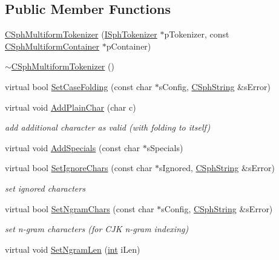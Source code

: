 \subsection*{Public Member Functions}
\begin{DoxyCompactItemize}
\item 
\hyperlink{classCSphMultiformTokenizer_aa8fb0bfe59c607b2fb6d7445d768e87b}{C\-Sph\-Multiform\-Tokenizer} (\hyperlink{classISphTokenizer}{I\-Sph\-Tokenizer} $\ast$p\-Tokenizer, const \hyperlink{structCSphMultiformContainer}{C\-Sph\-Multiform\-Container} $\ast$p\-Container)
\item 
\hyperlink{classCSphMultiformTokenizer_a6480ca37ffcd6fa83bb75df3e3e43501}{$\sim$\-C\-Sph\-Multiform\-Tokenizer} ()
\item 
virtual bool \hyperlink{classCSphMultiformTokenizer_a94d5a9911d1bfd113ec15d18e84e70e8}{Set\-Case\-Folding} (const char $\ast$s\-Config, \hyperlink{structCSphString}{C\-Sph\-String} \&s\-Error)
\item 
virtual void \hyperlink{classCSphMultiformTokenizer_a11eadf54c33b0e8bdba38f1f495f1c06}{Add\-Plain\-Char} (char c)
\begin{DoxyCompactList}\small\item\em add additional character as valid (with folding to itself) \end{DoxyCompactList}\item 
virtual void \hyperlink{classCSphMultiformTokenizer_a4cdf87215cdf5437a66ff176b86d63f8}{Add\-Specials} (const char $\ast$s\-Specials)
\item 
virtual bool \hyperlink{classCSphMultiformTokenizer_a82711511686c792c3ca9b71ff0a0454e}{Set\-Ignore\-Chars} (const char $\ast$s\-Ignored, \hyperlink{structCSphString}{C\-Sph\-String} \&s\-Error)
\begin{DoxyCompactList}\small\item\em set ignored characters \end{DoxyCompactList}\item 
virtual bool \hyperlink{classCSphMultiformTokenizer_a1d83cd1629715b74735a966be1a64534}{Set\-Ngram\-Chars} (const char $\ast$s\-Config, \hyperlink{structCSphString}{C\-Sph\-String} \&s\-Error)
\begin{DoxyCompactList}\small\item\em set n-\/gram characters (for C\-J\-K n-\/gram indexing) \end{DoxyCompactList}\item 
virtual void \hyperlink{classCSphMultiformTokenizer_a37e0613ccd63898053f7350c84e18d0b}{Set\-Ngram\-Len} (\hyperlink{sphinxexpr_8cpp_a4a26e8f9cb8b736e0c4cbf4d16de985e}{int} i\-Len)

\end{DoxyCompactItemize}
